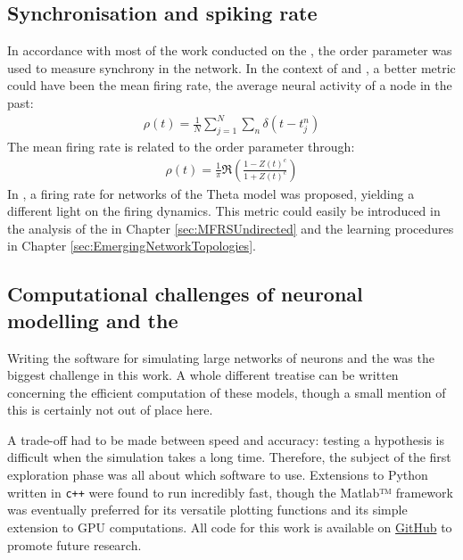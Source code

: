 \subsection{Synchronisation and spiking rate}
In accordance with most of the work conducted on the \MFR, the order parameter was used to measure synchrony in the network. In the context of \STDP and \IP, a better metric could have been the mean firing rate, the average neural activity of a node in the past:
\begin{align}
\rho(t)=\frac{1}{N} \sum_{j=1}^{N} \sum_{n} \delta\left(t-t_{j}^{n}\right)
\end{align}
The mean firing rate is related to the order parameter through:
\begin{align}
\rho(t) = \frac{1}{\pi} \Re \left(\frac{1-Z(t)^c}{1+Z(t)^c}\right)
\end{align}
In \cite{Montbrio2015}, a firing rate \MFR for networks of the Theta model was proposed, yielding a different light on the firing dynamics. This metric could easily be introduced in the analysis of the \MFR in Chapter \ref{sec:MFRSUndirected} and the learning procedures in Chapter \ref{sec:EmergingNetworkTopologies}.


\subsection{Computational challenges of neuronal modelling and the \MFR}
Writing the software for simulating large networks of neurons and the \MFR was the biggest challenge in this work. A whole different treatise can be written concerning the efficient computation of these models, though a small mention of this is certainly not out of place here.

A trade-off had to be made between speed and accuracy: testing a hypothesis is difficult when the simulation takes a long time. Therefore, the subject of the first exploration phase was all about which software to use. Extensions to Python written in \texttt{c++} were found to run incredibly fast, though the Matlab™ framework was eventually preferred for its versatile plotting functions and its simple extension to GPU computations. 
All code for this work is available on \href{https://github.com/simonaertssen/AdaptiveNeuronalNetworks}{GitHub} to promote future research. 


